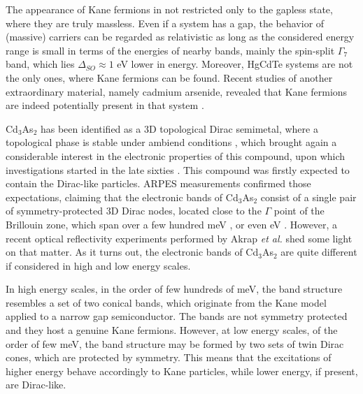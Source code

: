 \documentclass[titlepage,a4paper]{book}
\begin{document}
The appearance of Kane fermions in not restricted only to the gapless state, where they are truly massless. Even if a system has a gap, the behavior of (massive) carriers can be regarded as relativistic as long as the considered energy range is small in terms of the energies of nearby bands, mainly the spin-split $\Gamma_7$ band, which lies $\Delta_{SO} \approx 1$ eV \cite{Novik_MCT} lower in energy. Moreover, HgCdTe systems are not the only ones, where Kane fermions can be found. Recent studies of another extraordinary material, namely cadmium arsenide, revealed that Kane fermions are indeed potentially present in that system \cite{Akrap_CdAs}.

Cd$_3$As$_2$ has been identified as a 3D topological Dirac semimetal, where a topological phase is stable under ambiend conditions \cite{Liu_CdAs}, which brought again a considerable interest in the electronic properties of this compound, upon which investigations started in the late sixties \cite{Roseman_CdAs}\cite{Bodnar_CdAs}. This compound was firstly expected to contain the Dirac-like particles. ARPES measurements confirmed those expectations, claiming that the electronic bands of Cd$_3$As$_2$ consist of a single pair of symmetry-protected 3D Dirac nodes, located close to the $\Gamma$ point of the Brillouin zone, which span over a few hundred meV \cite{Borisenko_CdAs}\cite{Neupane_CdAs}, or even eV \cite{Liu_CdAs}. However, a recent optical reflectivity experiments performed by Akrap \textit{et al.} \cite{Akrap_CdAs} shed some light on that matter. As it turns out, the electronic bands of Cd$_3$As$_2$ are quite different if considered in high and low energy scales. 

In high energy scales, in the order of few hundreds of meV, the band structure resembles a set of two conical bands, which originate from the Kane model applied to a narrow gap semiconductor. The bands are not symmetry protected and they host a genuine Kane fermions. However, at low energy scales, of the order of few meV, the band structure may be formed by two sets of twin Dirac cones, which are protected by symmetry. This means that the excitations of higher energy behave accordingly to Kane particles, while lower energy, if present, are Dirac-like. 

\end{document}
